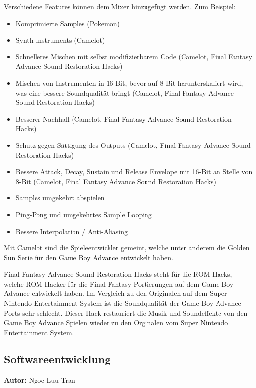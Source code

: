 \documentclass[11pt,a4paper]{scrartcl}
\newcommand{\AutorNgoc} {
    \vspace{-4mm}
    \large \textbf{Autor:} Ngoc Luu Tran \normalsize
    \vspace{2mm}
}
\begin{document}
Verschiedene Features k\"onnen dem Mixer hinzugef\"ugt werden. Zum Beispiel:
\begin{itemize}
    \item Komprimierte Samples (Pokemon)
    \item Synth Instruments (Camelot)
    \item Schnelleres Mischen mit selbst modifizierbarem Code\newline
    (Camelot, Final Fantasy Advance Sound Restoration Hacks)
    \item Mischen von Instrumenten in 16-Bit, bevor auf 8-Bit herunterskaliert wird, was eine bessere Soundqualit\"at bringt (Camelot, Final Fantasy Advance Sound Restoration Hacks)
    \item Besserer Nachhall (Camelot, Final Fantasy Advance Sound Restoration Hacks)
    \item Schutz gegen S\"attigung des Outputs (Camelot, Final Fantasy Advance Sound Restoration Hacks)
    \item Bessere Attack, Decay, Sustain und Release Envelope mit 16-Bit an Stelle von 8-Bit\newline
    (Camelot, Final Fantasy Advance Sound Restoration Hacks)
    \item Samples umgekehrt abspielen
    \item Ping-Pong und umgekehrtes Sample Looping
    \item Bessere Interpolation / Anti-Aliasing
\end{itemize}

Mit Camelot sind die Spieleentwickler gemeint, welche unter anderem die Golden Sun Serie f\"ur den Game Boy Advance entwickelt haben. 

Final Fantasy Advance Sound Restoration Hacks steht f\"ur die ROM Hacks, welche ROM Hacker f\"ur die Final Fantasy Portierungen auf dem Game Boy Advance entwickelt haben. Im Vergleich zu den Originalen auf dem Super Nintendo Entertainment System ist die Soundqualit\"at der Game Boy Advance Ports sehr schlecht. Dieser Hack restauriert die Musik und Soundeffekte von den Game Boy Advance Spielen wieder zu den Orginalen vom Super Nintendo Entertainment System.



\subsection{Softwareentwicklung} \label{Softwareentwicklung}
\AutorNgoc
\end{document}
